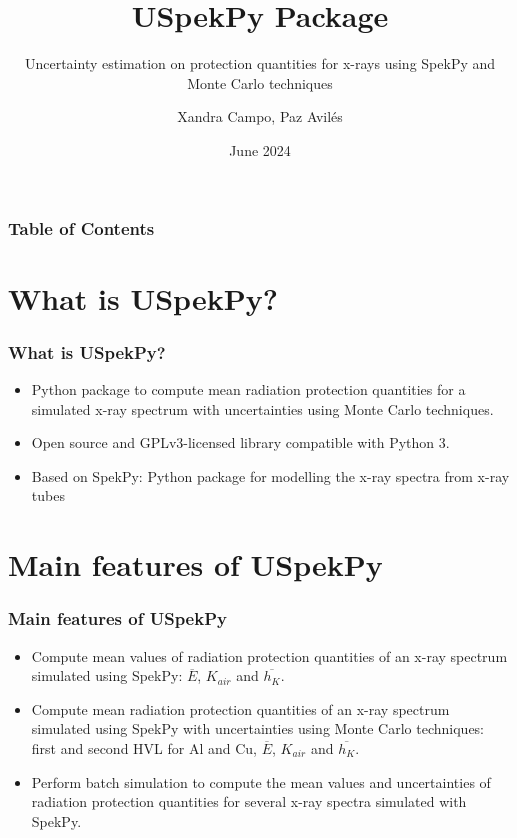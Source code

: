 \documentclass{beamer}
\title{USpekPy Package}
\subtitle{Uncertainty estimation on protection quantities for x-rays using SpekPy and Monte Carlo techniques}
\author{Xandra Campo, Paz Avilés}
\institute{Ionizing Radiation Metrology Laboratory (LMRI) \newline CIEMAT, Spain}
\date{June 2024}
\begin{document}
	\maketitle
	\begin{frame}
		\frametitle{Table of Contents}
		\tableofcontents
	\end{frame}
	
	\section{What is USpekPy?}
	\begin{frame}
		\frametitle{What is USpekPy?}
		\begin{itemize}
			\item {\color{blue} Python package} to compute mean radiation protection quantities for a simulated x-ray spectrum with uncertainties using Monte Carlo techniques.
			\item Open source and GPLv3-licensed library compatible with Python 3. 
			\item Based on {\color{blue} SpekPy}: Python package for modelling the x-ray spectra from x-ray tubes
		\end{itemize}		
	\end{frame}
	
	\section{Main features of USpekPy}
	\begin{frame}
		\frametitle{Main features of USpekPy}
		\begin{itemize}
		\item Compute {\color{blue} mean values of radiation protection quantities} of an x-ray spectrum simulated using SpekPy: $\overline{E}$, $K_{air}$ and $\overline{h_K}$.
		\item Compute {\color{blue} mean radiation protection quantities} of an x-ray spectrum simulated using SpekPy {\color{blue} with uncertainties} using Monte Carlo techniques: first and second HVL for Al and Cu, $\overline{E}$, $K_{air}$ and $\overline{h_K}$.
		\item Perform {\color{blue} batch simulation} to compute the mean values and uncertainties of radiation protection quantities for {\color{blue} several x-ray spectra} simulated with SpekPy.
		\end{itemize}
	\end{frame}
\end{document}
